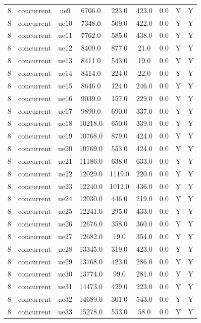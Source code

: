 \begin{table}[ht]
\begin{tabular}{|c|c|c|c|c|c|c|c|c|}
8 & concurrent & ue9 & 6706.0 & 223.0 & 423.0 & 0.0 & Y & Y \\
8 & concurrent & ue10 & 7348.0 & 509.0 & 422.0 & 0.0 & Y & Y \\
8 & concurrent & ue11 & 7762.0 & 585.0 & 438.0 & 0.0 & Y & Y \\
8 & concurrent & ue12 & 8409.0 & 877.0 & 21.0 & 0.0 & Y & Y \\
8 & concurrent & ue13 & 8411.0 & 543.0 & 19.0 & 0.0 & Y & Y \\
8 & concurrent & ue14 & 8414.0 & 224.0 & 22.0 & 0.0 & Y & Y \\
8 & concurrent & ue15 & 8646.0 & 124.0 & 246.0 & 0.0 & Y & Y \\
8 & concurrent & ue16 & 9039.0 & 157.0 & 229.0 & 0.0 & Y & Y \\
8 & concurrent & ue17 & 9890.0 & 690.0 & 337.0 & 0.0 & Y & Y \\
8 & concurrent & ue18 & 10218.0 & 650.0 & 339.0 & 0.0 & Y & Y \\
8 & concurrent & ue19 & 10768.0 & 879.0 & 424.0 & 0.0 & Y & Y \\
8 & concurrent & ue20 & 10769.0 & 553.0 & 424.0 & 0.0 & Y & Y \\
8 & concurrent & ue21 & 11186.0 & 638.0 & 633.0 & 0.0 & Y & Y \\
8 & concurrent & ue22 & 12029.0 & 1119.0 & 220.0 & 0.0 & Y & Y \\
8 & concurrent & ue23 & 12240.0 & 1012.0 & 436.0 & 0.0 & Y & Y \\
8 & concurrent & ue24 & 12030.0 & 446.0 & 219.0 & 0.0 & Y & Y \\
8 & concurrent & ue25 & 12241.0 & 295.0 & 433.0 & 0.0 & Y & Y \\
8 & concurrent & ue26 & 12676.0 & 358.0 & 360.0 & 0.0 & Y & Y \\
8 & concurrent & ue27 & 12682.0 & 19.0 & 354.0 & 0.0 & Y & Y \\
8 & concurrent & ue28 & 13345.0 & 319.0 & 423.0 & 0.0 & Y & Y \\
8 & concurrent & ue29 & 13768.0 & 423.0 & 286.0 & 0.0 & Y & Y \\
8 & concurrent & ue30 & 13774.0 & 99.0 & 281.0 & 0.0 & Y & Y \\
8 & concurrent & ue31 & 14473.0 & 429.0 & 223.0 & 0.0 & Y & Y \\
8 & concurrent & ue32 & 14689.0 & 301.0 & 543.0 & 0.0 & Y & Y \\
8 & concurrent & ue33 & 15278.0 & 553.0 & 58.0 & 0.0 & Y & Y \\

\end{tabular}
\end{table}
